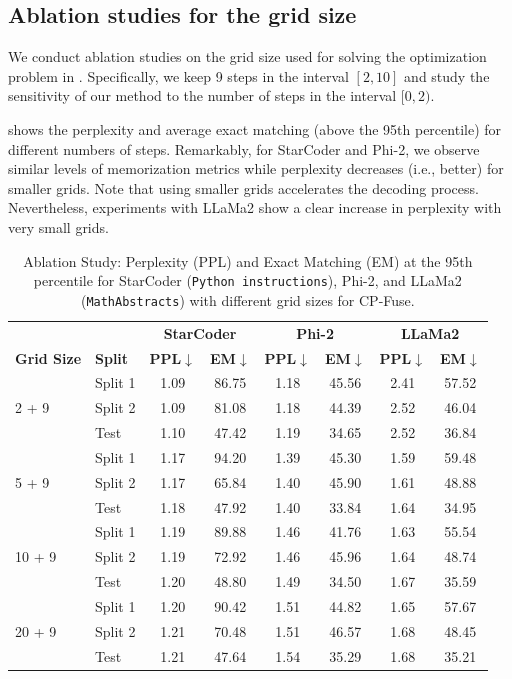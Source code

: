 \subsection{Ablation studies for the grid size}
\label{app:ablation_grid}

We conduct ablation studies on the grid size used for solving the optimization problem in . Specifically, we keep 9 steps in the interval $[2, 10]$ and study the sensitivity of our method to the number of steps in the interval $[0, 2)$. 

 shows the perplexity and average exact matching (above the 95th percentile) for different numbers of steps. Remarkably, for StarCoder and Phi-2, we observe similar levels of memorization metrics while perplexity decreases (i.e., better) for smaller grids. Note that using smaller grids accelerates the decoding process. Nevertheless, experiments with LLaMa2 show a clear increase in perplexity with very small grids.

\begin{table}[h]
\centering
\caption{Ablation Study: Perplexity (PPL) and Exact Matching (EM) at the 95th percentile for StarCoder (\texttt{Python instructions}), Phi-2, and LLaMa2 (\texttt{MathAbstracts}) with different grid sizes for CP-Fuse.}
\begin{tabular}{ll|cc|cc|cc}
\toprule
& & \multicolumn{2}{c|}{\textbf{StarCoder}} & \multicolumn{2}{c|}{\textbf{Phi-2}} & \multicolumn{2}{c}{\textbf{LLaMa2}} \\
\textbf{Grid Size} & \textbf{Split} & \textbf{PPL}$\downarrow$ & \textbf{EM}$\downarrow$ & \textbf{PPL}$\downarrow$ & \textbf{EM}$\downarrow$ & \textbf{PPL}$\downarrow$ & \textbf{EM}$\downarrow$ \\
\midrule
\multirow{3}{*}{2 + 9}
& Split 1 & 1.09 & 86.75 & 1.18 & 45.56 & 2.41 & 57.52 \\
& Split 2 & 1.09 & 81.08 & 1.18 & 44.39 & 2.52 & 46.04 \\
& Test & 1.10 & 47.42 & 1.19 & 34.65 & 2.52 & 36.84 \\
\midrule
\multirow{3}{*}{5 + 9}
& Split 1 & 1.17 & 94.20 & 1.39 & 45.30 & 1.59 & 59.48 \\
& Split 2 & 1.17 & 65.84 & 1.40 & 45.90 & 1.61 & 48.88 \\
& Test & 1.18 & 47.92 & 1.40 & 33.84 & 1.64 & 34.95 \\
\midrule
\multirow{3}{*}{10 + 9}
& Split 1 & 1.19 & 89.88 & 1.46 & 41.76 & 1.63 & 55.54 \\
& Split 2 & 1.19 & 72.92 & 1.46 & 45.96 & 1.64 & 48.74 \\
& Test & 1.20 & 48.80 & 1.49 & 34.50 & 1.67 & 35.59 \\
\midrule
\multirow{3}{*}{20 + 9}
& Split 1 & 1.20 & 90.42 & 1.51 & 44.82 & 1.65 & 57.67 \\
& Split 2 & 1.21 & 70.48 & 1.51 & 46.57 & 1.68 & 48.45 \\
& Test & 1.21 & 47.64 & 1.54 & 35.29 & 1.68 & 35.21 \\
\bottomrule
\end{tabular}
\label{tab:ablation_grid}
\end{table}

